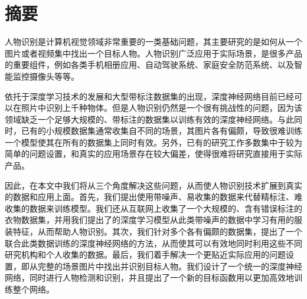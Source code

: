 \chapter*{摘要}
人物识别是计算机视觉领域非常重要的一类基础问题，其主要研究的是如何从一个图片或者视频集中找出一个目标人物。人物识别广泛应用于实际场景，是很多产品的重要组件，例如各类手机相册应用、自动驾驶系统、家庭安全防范系统、以及智能监控摄像头等等。

依托于深度学习技术的发展和大型带标注数据集的出现，深度神经网络目前已经可以在照片中识别上千种物体。但是人物识别仍然是一个很有挑战性的问题，因为该领域缺乏一个足够大规模的、带标注的数据集以训练有效的深度神经网络。与此同时，已有的小规模数据集通常收集自不同的场景，其图片各有偏颇，导致很难训练一个模型使其在所有的数据集上同时有效。另外，已有的研究工作多数集中于较为简单的问题设置，和真实的应用场景存在较大偏差，使得很难将研究直接用于实际产品。

因此，在本文中我们将从三个角度解决这些问题，从而使人物识别技术扩展到真实的数据和应用上面。首先，我们提出使用带噪声、易收集的数据来代替精标注、难收集的数据来训练模型。我们还从互联网上收集了一个大规模的、含有错误标注的衣物数据集，并用我们提出了的深度学习模型从此类带噪声的数据中学习有用的服装特征，从而帮助人物识别。其次，我们针对多个各有偏颇的数据集，提出了一个联合此类数据训练的深度神经网络的方法，从而使其可以有效地同时利用这些不同研究机构和个人收集的数据。最后，我们着手解决一个更贴近实际应用的问题设置，即从完整的场景图片中找出并识别目标人物。我们设计了一个统一的深度神经网络，同时进行人物检测和识别，并且提出了一个新的目标函数用以更加高效地训练整个网络。
